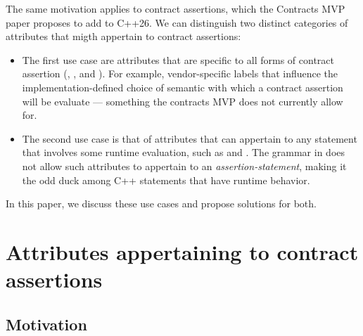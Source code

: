 The same motivation applies to contract assertions, which the Contracts MVP paper \cite{P2900R5} proposes to add to C++26. We can distinguish two distinct categories of attributes that migth appertain to contract assertions:

\begin{itemize}
\item The first use case are attributes that are specific to all forms of contract assertion (, , and ).  For example, vendor-specific labels that influence the implementation-defined choice of semantic with which a contract assertion will be evaluate --- something the contracts MVP does not currently allow for.

\item The second use case is that of attributes that can appertain to any statement that involves some runtime evaluation, such as \tcode{[[likely]]} and \tcode{[[unlikely]]}. The grammar in \cite{P2900R5} does not allow such attributes to appertain to an \emph{assertion-statement}, making it the odd duck among C++ statements that have runtime behavior.
\end{itemize}

In this paper, we discuss these use cases and propose solutions for both.


\section{Attributes appertaining to contract assertions}
\label{sec:labels}
 
 \subsection{Motivation}
 
